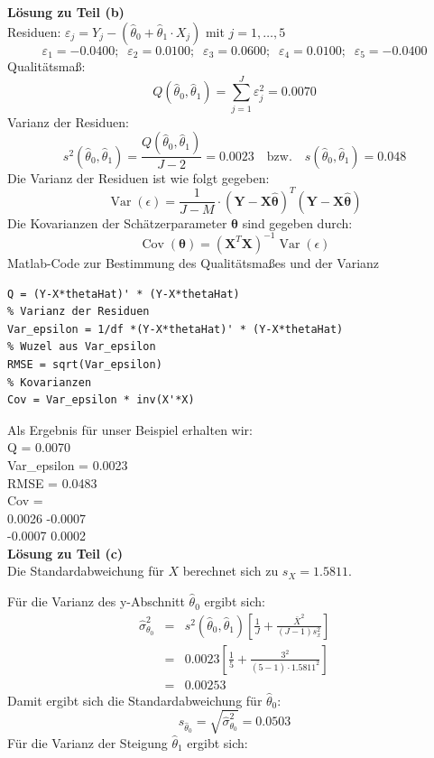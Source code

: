 \textbf{Lösung zu Teil (b)} \\
Residuen: $\varepsilon_j = Y_j -(\hat\theta _0 + \hat\theta _1 \cdot X_j)$
mit $j=1,\ldots ,5$
\[\varepsilon_1 = -0.0400; \;\; \varepsilon_2 =  0.0100;\;\;
\varepsilon_3= 0.0600;\;\; \varepsilon_4 =0.0100;\;\;
\varepsilon_5 = -0.0400
\]
Qualitätsmaß:
\[
Q(\hat\theta _0,\hat\theta _1) = \sum\limits_{j = 1}^J {\varepsilon_j ^2 } 
= 0.0070
\]
Varianz der Residuen:
\[
s^2(\hat{\theta}_0 ,\hat{\theta}_1 ) = \frac{Q(\hat{\theta}_0 ,
	\hat{\theta}_1 )}{J - 2} = 0.0023 \quad \text{bzw.} \quad
s(\hat{\theta}_0 ,\hat{\theta}_1 ) = 0.048 
\]
Die Varianz der Residuen ist wie folgt gegeben:
\begin{equation}
\operatorname{Var}(\epsilon) = \frac{1}{J-M} \cdot \left(\mathbf Y - \mathbf X \hat{\boldsymbol\theta}\right)^T 
\left(\mathbf Y - \mathbf X \hat{\boldsymbol\theta}\right)
\end{equation}
Die Kovarianzen der Schätzerparameter ${\boldsymbol\theta}$ 
sind gegeben durch:
\begin{equation}
\operatorname{Cov}(\boldsymbol\theta) = \left(\mathbf{X}^T \mathbf X \right)^{-1}
\operatorname{Var}(\epsilon)
\end{equation}
Matlab-Code zur Bestimmung des Qualitätsmaßes und der Varianz
\begin{lstlisting}[style=Matlab]
% Qualitaetsmass Q
Q = (Y-X*thetaHat)' * (Y-X*thetaHat)
% Varianz der Residuen
Var_epsilon = 1/df *(Y-X*thetaHat)' * (Y-X*thetaHat)
% Wuzel aus Var_epsilon
RMSE = sqrt(Var_epsilon)
% Kovarianzen
Cov = Var_epsilon * inv(X'*X)
\end{lstlisting}
Als Ergebnis für unser Beispiel erhalten wir:\\
Q = 0.0070 \\
Var\_epsilon = 0.0023\\
RMSE = 0.0483 \\
Cov = \\
0.0026   -0.0007 \\
-0.0007    0.0002 \\

\textbf{Lösung zu Teil (c)} \\
Die Standardabweichung für $X$ berechnet sich zu $s_X = 1.5811$.

Für die Varianz des y-Abschnitt $\hat\theta_0$ ergibt sich: 
\begin{eqnarray}
\hat\sigma_{\theta_0}^2 &=& s^2(\hat{\theta}_0 ,\hat{\theta}_1 )
\left[\frac{1}{J} + \frac{\bar{X}^2}{(J-1)s_x^2 } \right]
\nonumber \\ 
&=& 
0.0023
\left[\frac{1}{5} + \frac{3^2}{(5-1)\cdot 1.5811^2 } \right]
\nonumber\\ 
&=& 0.00253 \nonumber
\end{eqnarray}
Damit ergibt sich die Standardabweichung für $\hat\theta_0$:
\[
s_{\hat\theta_0} = \sqrt{\hat\sigma_{\theta_0}^2} = 0.0503
\]
Für die Varianz der Steigung $\hat\theta_1$ ergibt sich: 

